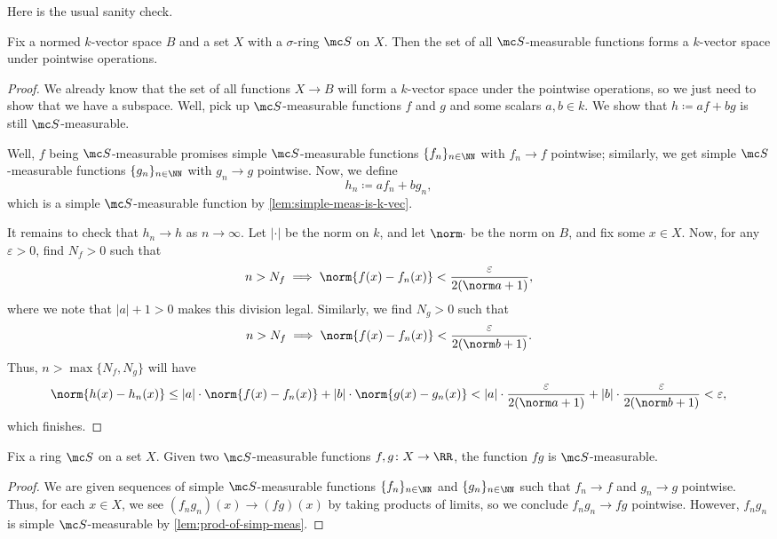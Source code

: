 \documentclass[../notes.tex]{subfiles}
\begin{document}
Here is the usual sanity check.
\begin{lemma} \label{lem:meas-is-vec-space}
	Fix a normed $k$-vector space $B$ and a set $X$ with a $\sigma$-ring $\mc S$ on $X$. Then the set of all $\mc S$-measurable functions forms a $k$-vector space under pointwise operations.
\end{lemma}
\begin{proof}
	We already know that the set of all functions $X\to B$ will form a $k$-vector space under the pointwise operations, so we just need to show that we have a subspace. Well, pick up $\mc S$-measurable functions $f$ and $g$ and some scalars $a,b\in k$. We show that $h\coloneqq af+bg$ is still $\mc S$-measurable.

	Well, $f$ being $\mc S$-measurable promises simple $\mc S$-measurable functions $\{f_n\}_{n\in\NN}$ with $f_n\to f$ pointwise; similarly, we get simple $\mc S$-measurable functions $\{g_n\}_{n\in\NN}$ with $g_n\to g$ pointwise. Now, we define
	\[h_n\coloneqq af_n+bg_n,\]
	which is a simple $\mc S$-measurable function by \autoref{lem:simple-meas-is-k-vec}.

	It remains to check that $h_n\to h$ as $n\to\infty$. Let $|\cdot|$ be the norm on $k$, and let $\norm\cdot$ be the norm on $B$, and fix some $x\in X$. Now, for any $\varepsilon>0$, find $N_f>0$ such that
	\[n>N_f\implies\norm{f(x)-f_n(x)}<\frac\varepsilon{2(\norm a+1)},\]
	where we note that $|a|+1>0$ makes this division legal. Similarly, we find $N_g>0$ such that
	\[n>N_f\implies\norm{f(x)-f_n(x)}<\frac\varepsilon{2(\norm b+1)}.\]
	Thus, $n>\max\{N_f,N_g\}$ will have
	\[\norm{h(x)-h_n(x)}\le |a|\cdot\norm{f(x)-f_n(x)}+|b|\cdot\norm{g(x)-g_n(x)}<|a|\cdot\frac\varepsilon{2(\norm a+1)}+|b|\cdot\frac\varepsilon{2(\norm b+1)}<\varepsilon,\]
	which finishes.
\end{proof}
\begin{lemma} \label{lem:prod-of-meas}
	Fix a ring $\mc S$ on a set $X$. Given two $\mc S$-measurable functions $f,g\colon X\to\RR$, the function $fg$ is $\mc S$-measurable.
\end{lemma}
\begin{proof}
	We are given sequences of simple $\mc S$-measurable functions $\{f_n\}_{n\in\NN}$ and $\{g_n\}_{n\in\NN}$ such that $f_n\to f$ and $g_n\to g$ pointwise. Thus, for each $x\in X$, we see $(f_ng_n)(x)\to(fg)(x)$ by taking products of limits, so we conclude $f_ng_n\to fg$ pointwise. However, $f_ng_n$ is simple $\mc S$-measurable by \autoref{lem:prod-of-simp-meas}.
\end{proof}
\end{document}
